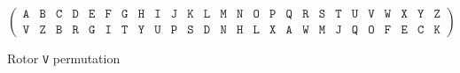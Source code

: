 \begin{center}
  \begin{figure}[h]
    \[
      \left(
        \begin{array}{llllllllllllllllllllllllll}
          \texttt{A} & \texttt{B} & \texttt{C} & \texttt{D} &
          \texttt{E} & \texttt{F} & \texttt{G} & \texttt{H} &
          \texttt{I} & \texttt{J} & \texttt{K} & \texttt{L} &
          \texttt{M} & \texttt{N} & \texttt{O} & \texttt{P} &
          \texttt{Q} & \texttt{R} & \texttt{S} & \texttt{T} &
          \texttt{U} & \texttt{V} & \texttt{W} & \texttt{X} &
          \texttt{Y} & \texttt{Z}                             \\
          \texttt{V} & \texttt{Z} & \texttt{B} & \texttt{R} &
          \texttt{G} & \texttt{I} & \texttt{T} & \texttt{Y} &
          \texttt{U} & \texttt{P} & \texttt{S} & \texttt{D} &
          \texttt{N} & \texttt{H} & \texttt{L} & \texttt{X} &
          \texttt{A} & \texttt{W} & \texttt{M} & \texttt{J} &
          \texttt{Q} & \texttt{O} & \texttt{F} & \texttt{E} &
          \texttt{C} & \texttt{K}
        \end{array}
      \right)
    \]
    \caption{Rotor \texttt{V} permutation}
    \label{fig:rotor_v_wiring}
  \end{figure}
\end{center}

